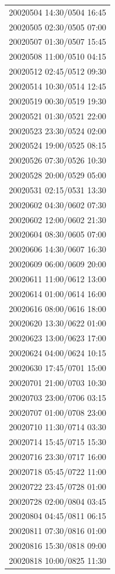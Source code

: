 \documentclass[draft]{agujournal2019}
\begin{document}
\begin{center}
\begin{longtable}{c}
20020504 14:30/0504 16:45 \\
20020505 02:30/0505 07:00 \\
20020507 01:30/0507 15:45 \\
20020508 11:00/0510 04:15 \\
20020512 02:45/0512 09:30 \\
20020514 10:30/0514 12:45 \\
20020519 00:30/0519 19:30 \\
20020521 01:30/0521 22:00 \\
20020523 23:30/0524 02:00 \\
20020524 19:00/0525 08:15 \\
20020526 07:30/0526 10:30 \\
20020528 20:00/0529 05:00 \\
20020531 02:15/0531 13:30 \\
20020602 04:30/0602 07:30 \\
20020602 12:00/0602 21:30 \\
20020604 08:30/0605 07:00 \\
20020606 14:30/0607 16:30 \\
20020609 06:00/0609 20:00 \\
20020611 11:00/0612 13:00 \\
20020614 01:00/0614 16:00 \\
20020616 08:00/0616 18:00 \\
20020620 13:30/0622 01:00 \\
20020623 13:00/0623 17:00 \\
20020624 04:00/0624 10:15 \\
20020630 17:45/0701 15:00 \\
20020701 21:00/0703 10:30 \\
20020703 23:00/0706 03:15 \\
20020707 01:00/0708 23:00 \\
20020710 11:30/0714 03:30 \\
20020714 15:45/0715 15:30 \\
20020716 23:30/0717 16:00 \\
20020718 05:45/0722 11:00 \\
20020722 23:45/0728 01:00 \\ 
20020728 02:00/0804 03:45 \\ 
20020804 04:45/0811 06:15 \\ 
20020811 07:30/0816 01:00 \\ 
20020816 15:30/0818 09:00 \\
20020818 10:00/0825 11:30 \\ 

\end{longtable}
\end{center}
\end{document}
